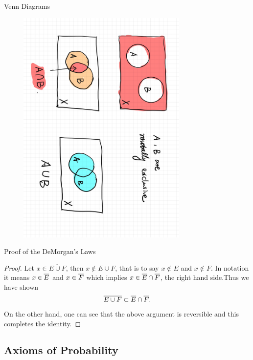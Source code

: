 \begin{frame}{Venn Diagrams}
	\begin{figure}[ht]
		\centering
		\includegraphics[angle=90,width=0.75\textwidth]{venndiag.jpg}
	\end{figure}
\end{frame}

\begin{frame}{Proof of the DeMorgan's Laws}
	\begin{proof}
	Let $x\in \overline{E\cup F}$, then $x\notin E\cup F$, that is to say $x\notin E$ and $x\notin F$. In notation it means $x\in \overline E$ and $x\in \overline F$ which implies $x\in \overline E \cap \overline F$, the right hand side.\pause  Thus we have shown 
	\[\overline{E\cup F}\subset \overline E \cap \overline F.\]\pause
	On the other hand, one can see that the above argument is reversible  and this completes the identity.
\end{proof}
\end{frame}

\subsection{Axioms of Probability}

